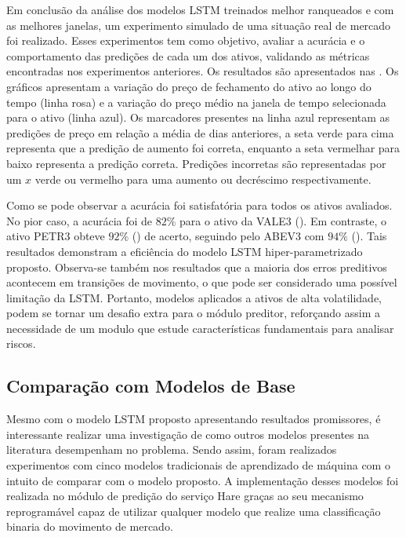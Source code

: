 

Em conclusão da análise dos modelos \acrshort{LSTM} treinados melhor ranqueados e com as melhores janelas, um experimento simulado de uma situação real de mercado foi realizado. Esses experimentos tem como objetivo, avaliar a acurácia e o comportamento das predições de cada um dos ativos, validando as métricas encontradas nos experimentos anteriores. Os resultados são apresentados nas . Os gráficos apresentam a variação do preço de fechamento do ativo ao longo do tempo (linha rosa) e a variação do preço médio na janela de tempo selecionada para o ativo (linha azul). Os marcadores presentes na linha azul representam as predições de preço em relação a média de dias anteriores, a seta verde para cima representa que a predição de aumento foi correta, enquanto a seta vermelhar para baixo representa a predição correta. Predições incorretas são representadas por um $x$ verde ou vermelho para uma aumento ou decréscimo respectivamente.


%
%
%

Como se pode observar a acurácia foi satisfatória para todos os ativos avaliados. No pior caso, a acurácia foi de $82\%$ para o ativo da VALE3 (). Em contraste, o ativo PETR3 obteve $92\%$ () de acerto, seguindo pelo ABEV3 com $94\%$ (). Tais resultados demonstram a eficiência do modelo \acrshort{LSTM} hiper-parametrizado proposto. Observa-se também nos resultados que a maioria dos erros preditivos acontecem em transições de movimento, o que pode ser considerado uma possível limitação da \acrshort{LSTM}. Portanto, modelos aplicados a ativos de alta volatilidade, podem se tornar um desafio extra para o módulo preditor, reforçando assim a necessidade de um modulo que estude características fundamentais para analisar riscos.


\subsection{Comparação com Modelos de Base}
\label{exp:base}

Mesmo com o modelo \acrshort{LSTM} proposto apresentando resultados promissores, é interessante realizar uma investigação de como outros modelos presentes na literatura desempenham no problema. Sendo assim, foram realizados experimentos com cinco modelos tradicionais de aprendizado de máquina com o intuito de comparar com o modelo proposto. A implementação desses modelos foi realizada no módulo de predição do serviço Hare graças ao seu mecanismo reprogramável capaz de utilizar qualquer modelo que realize uma classificação binaria do movimento de mercado. 

